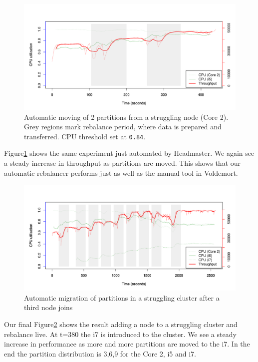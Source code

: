\clearpage
\begin{figure}[h]
    \centering
    \includegraphics[width=1.2\textwidth]{results/rebalance_auto_2node}
    \caption{Automatic moving of 2 partitions from a struggling node (Core 2). Grey regions mark rebalance period, where data is prepared and transferred. CPU threshold set at \texttt{0.84}.}
    \label{fig:adaptive_auto}
\end{figure}
Figure\ref{fig:adaptive_auto} shows the same experiment just automated by Headmaster. We again see a steady increase in throughput as partitions are moved. This shows that our automatic rebalancer performs just as well as the manual tool in Voldemort.  

\clearpage
\begin{figure}[h]
    \centering
    \includegraphics[width=1.0\textwidth]{results/adaptive3node}
    \caption{Automatic migration of partitions in a struggling cluster after a third node joins}
    \label{fig:adapt_3node}
\end{figure}
Our final Figure\ref{fig:adapt_3node} shows the result adding a node to a struggling cluster and rebalance live. At t=380 the i7 is introduced to the cluster. We see a steady increase in performance as more and more partitions are moved to the i7. In the end the partition distribution is 3,6,9 for the Core 2, i5 and i7. 

